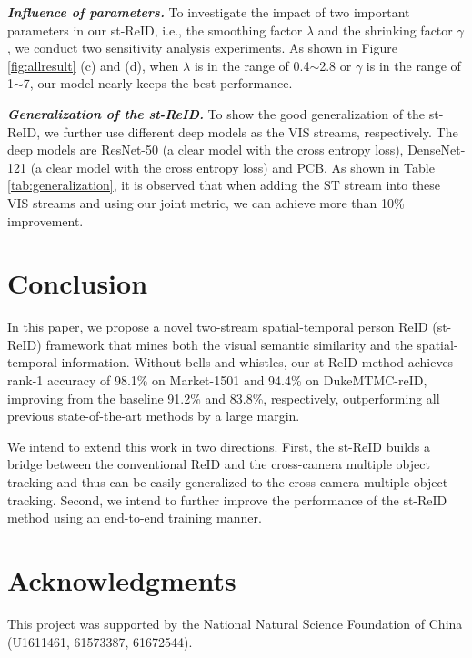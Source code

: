 \documentclass[letterpaper]{article} %
\begin{document}
\textbf{\emph{Influence of parameters.}} To investigate the impact of two important parameters in our st-ReID, i.e., the smoothing factor ${\lambda}$ and the shrinking factor ${\gamma}$, we conduct two sensitivity analysis experiments. As shown in Figure \ref{fig:allresult} (c) and (d), when ${\lambda}$ is in the range of 0.4$\sim$2.8 or ${\gamma}$ is in the range of 1$\sim$7, our model nearly keeps the best performance.

\textbf{\emph{Generalization of the st-ReID.}} To show the good generalization of the st-ReID, we further use different deep models as the VIS streams, respectively. The deep models are ResNet-50 (a clear model with the cross entropy loss), DenseNet-121 (a clear model with the cross entropy loss) and PCB. As shown in Table \ref{tab:generalization}, it is observed that when adding the ST stream into these VIS streams and using our joint metric, we can achieve more than 10\% improvement.

\section{Conclusion}
\label{sec:con}
In this paper, we propose a novel two-stream spatial-temporal person ReID (st-ReID) framework that mines both the visual semantic similarity and the spatial-temporal information. Without bells and whistles, our st-ReID method achieves rank-1 accuracy of 98.1\% on Market-1501 and 94.4\% on  DukeMTMC-reID, improving from the baseline 91.2\% and 83.8\%, respectively, outperforming all previous state-of-the-art methods by a large margin.

We intend to extend this work in two directions. First, the st-ReID builds a bridge between the conventional ReID and the cross-camera multiple object tracking and thus can be easily generalized to the cross-camera multiple object tracking. Second, we intend to further improve the performance of the st-ReID method using an end-to-end training manner.

\section{Acknowledgments}
This project was supported by the National Natural Science Foundation of China (U1611461, 61573387, 61672544).




\end{document}
